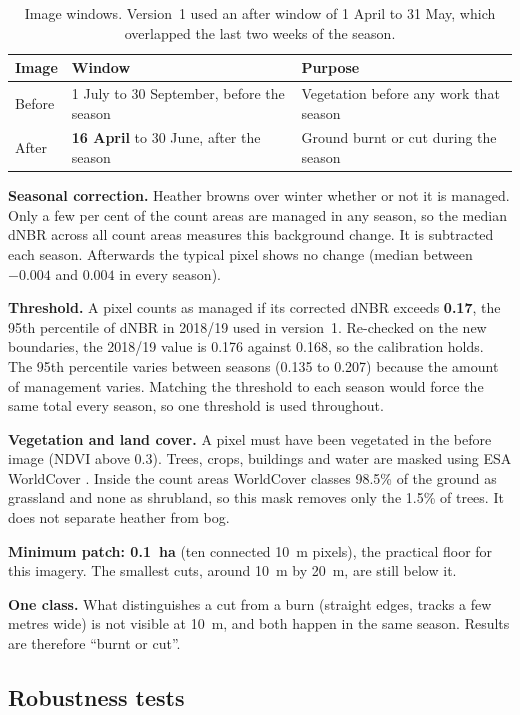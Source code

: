 \documentclass[11pt,a4paper]{article}
\begin{document}
\begin{table}[htbp]
\centering
\caption{Image windows. Version~1 used an after window of 1 April to 31 May, which overlapped the last two weeks of the season.}\label{tab:windows}
\small
\begin{tabular}{lll}
\toprule
Image & Window & Purpose \\
\midrule
Before & 1 July to 30 September, before the season & Vegetation before any work that season \\
After & \textbf{16 April} to 30 June, after the season & Ground burnt or cut during the season \\
\bottomrule
\end{tabular}
\end{table}

\textbf{Seasonal correction.} Heather browns over winter whether or not it is managed. Only a few per cent of the count areas are managed in any season, so the median dNBR across all count areas measures this background change. It is subtracted each season. Afterwards the typical pixel shows no change (median between $-0.004$ and $0.004$ in every season).

\textbf{Threshold.} A pixel counts as managed if its corrected dNBR exceeds \textbf{0.17}, the 95th percentile of dNBR in 2018/19 used in version~1. Re-checked on the new boundaries, the 2018/19 value is 0.176 against 0.168, so the calibration holds. The 95th percentile varies between seasons (0.135 to 0.207) because the amount of management varies. Matching the threshold to each season would force the same total every season, so one threshold is used throughout.

\textbf{Vegetation and land cover.} A pixel must have been vegetated in the before image (NDVI above 0.3). Trees, crops, buildings and water are masked using ESA WorldCover \citep{zanaga2022}. Inside the count areas WorldCover classes 98.5\% of the ground as grassland and none as shrubland, so this mask removes only the 1.5\% of trees. It does not separate heather from bog.

\textbf{Minimum patch: 0.1~ha} (ten connected 10~m pixels), the practical floor for this imagery. The smallest cuts, around 10~m by 20~m, are still below it.

\textbf{One class.} What distinguishes a cut from a burn (straight edges, tracks a few metres wide) is not visible at 10~m, and both happen in the same season. Results are therefore ``burnt or cut''.

\subsection{Robustness tests}\label{sec:methods-robust}
\end{document}
